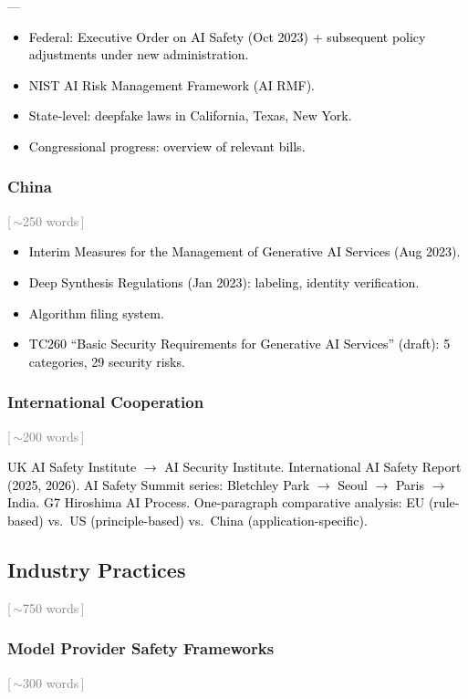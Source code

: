 ––\documentclass[preprint,12pt]{elsarticle}
\newcommand{\wordcount}[1]{\hfill\textcolor{gray}{\small[\,#1\,]}}
\newcommand{\outline}[1]{\textcolor{black}{#1}}
\begin{document}
\outline{%
\begin{itemize}[nosep,leftmargin=1.5em]
    \item Federal: Executive Order on AI Safety (Oct 2023) + subsequent policy adjustments under new administration.
    \item NIST AI Risk Management Framework (AI RMF).
    \item State-level: deepfake laws in California, Texas, New York.
    \item Congressional progress: overview of relevant bills.
\end{itemize}
}

\subsubsection{China} \wordcount{$\sim$250 words}

\outline{%
\begin{itemize}[nosep,leftmargin=1.5em]
    \item Interim Measures for the Management of Generative AI Services (Aug 2023).
    \item Deep Synthesis Regulations (Jan 2023): labeling, identity verification.
    \item Algorithm filing system.
    \item TC260 ``Basic Security Requirements for Generative AI Services'' (draft): 5 categories, 29 security risks.
\end{itemize}
}

\subsubsection{International Cooperation} \wordcount{$\sim$200 words}

\outline{%
UK AI Safety Institute $\to$ AI Security Institute. International AI Safety Report (2025, 2026). AI Safety Summit series: Bletchley Park $\to$ Seoul $\to$ Paris $\to$ India. G7 Hiroshima AI Process. One-paragraph comparative analysis: EU (rule-based) vs.\ US (principle-based) vs.\ China (application-specific).
}


\subsection{Industry Practices} \wordcount{$\sim$750 words}
\label{sec:gov-industry}

\subsubsection{Model Provider Safety Frameworks} \wordcount{$\sim$300 words}
\end{document}
